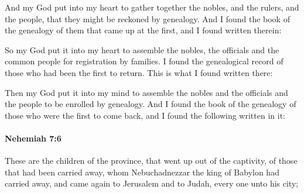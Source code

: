 			\begin{versebox}
					\item[BHS] 
					\item[LXX] 
					\item[ASV] And my God put into my heart to gather together the nobles, and the rulers, and the people, that they might be reckoned by genealogy. And I found the book of the genealogy of them that came up at the first, and I found written therein:
					\item[NIV] So my God put it into my heart to assemble the nobles, the officials and the common people for registration by families. I found the genealogical record of those who had been the first to return. This is what I found written there:
					\item[NRSV] Then my God put it into my mind to assemble the nobles and the officials and the people to be enrolled by genealogy. And I found the book of the genealogy of those who were the first to come back, and I found the following written in it:
			\end{versebox}

		\paragraph{Nehemiah 7:6} %
			\label{NEHEMIAH-7-6}

			These are the children of the province, that went up out of the captivity, of those that had been carried away, whom Nebuchadnezzar the king of Babylon had carried away, and came again to Jerusalem and to Judah, every one unto his city;

